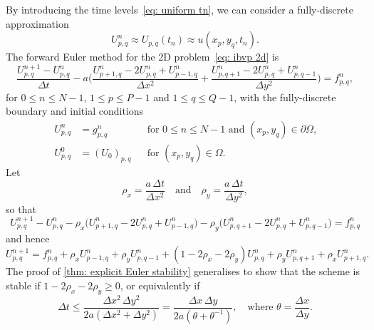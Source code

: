 By introducing the time levels~\eqref{eq: uniform tn}, we can consider a
fully-discrete approximation
\[
U^n_{p,q}\approx U_{p,q}(t_n)\approx u(x_p,y_q,t_n).
\]
The forward Euler method for the 2D problem~\eqref{eq: ibvp 2d} is
\[
\frac{U^{n+1}_{p,q}-U^n_{p,q}}{\Delta t}
	-a\biggl(\frac{U_{p+1,q}^n-2U_{p,q}^n+U_{p-1,q}^n}{\Delta x^2}
	+\frac{U_{p,q+1}^n-2U_{p,q}^n+U_{p,q-1}^n}{\Delta y^2}\biggr)=f_{p,q}^n,
\]
for $0\le n\le N-1$, $1\le p\le P-1$ and $1\le q\le Q-1$, with the 
fully-discrete boundary and initial conditions
\begin{equation}\label{eq: fully discrete bc ic 2d}
\begin{aligned}
U^n_{p,q}&=g^n_{p,q}&
&\text{for $0\le n\le N-1$ and $(x_p,y_q)\in\partial\Omega$,}\\
U^0_{p,q}&=(U_0)_{p,q}&
&\text{for $(x_p,y_q)\in\Omega$.}
\end{aligned}
\end{equation}
Let
\[
\rho_x=\frac{a\,\Delta t}{\Delta x^2}\quad\text{and}\quad
\rho_y=\frac{a\,\Delta t}{\Delta y^2},
\]
so that
\[
U^{n+1}_{p,q}-U^n_{p,q}-\rho_x\bigl(U^n_{p+1,q}-2U^n_{p,q}+U^n_{p-1,q}\bigr)
	-\rho_y\bigl(U^n_{p,q+1}-2U^n_{p,q}+U^n_{p,q-1}\bigr)
	=f^n_{p,q}
\]
and hence
\[
U^{n+1}_{p,q}=f^n_{p,q}+\rho_xU^n_{p-1,q}+\rho_yU^n_{p,q-1}
	+(1-2\rho_x-2\rho_y)U^n_{p,q}+\rho_yU^n_{p,q+1}+\rho_xU^n_{p+1,q}.
\]
The proof of \cref{thm: explicit Euler stability} generalises to
show that the scheme is stable if $1-2\rho_x-2\rho_y\ge0$, or equivalently if
\[
\Delta t\le\frac{\Delta x^2\,\Delta y^2}{2a(\Delta x^2+\Delta y^2)}
	=\frac{\Delta x\,\Delta y}{2a(\theta+\theta^{-1})},
\quad\text{where $\theta=\frac{\Delta x}{\Delta y}$.}
\]

